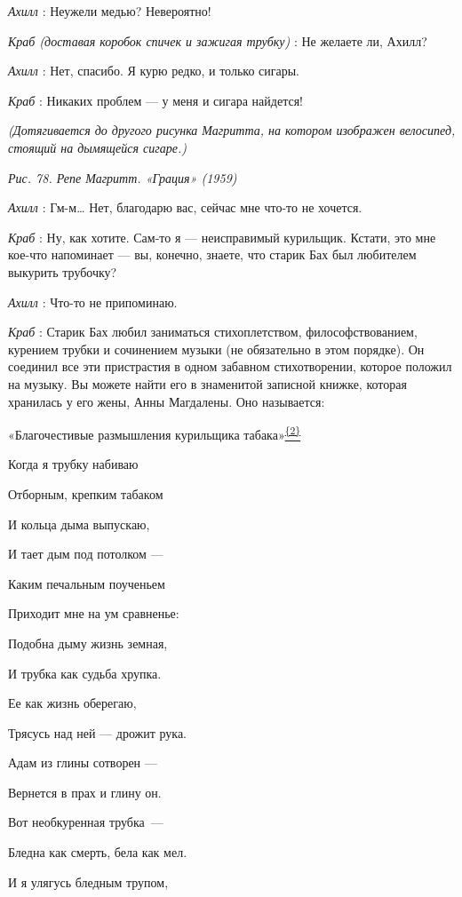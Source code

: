 \documentclass[../main.tex]{subfiles}
\begin{document}
\begin{dialogue}
\emph{Ахилл} : Неужели медью? Невероятно!

\emph{Краб (доставая коробок спичек и зажигая трубку)} : Не желаете ли, Ахилл?

\emph{Ахилл} : Нет, спасибо. Я курю редко, и только сигары.

\emph{Краб} : Никаких проблем --- у меня и сигара найдется!

\emph{(Дотягивается до другого рисунка Магритта, на котором изображен велосипед, стоящий на дымящейся сигаре.)}

\emph{Рис. 78. Репе Магритт. «Грация» (1959)}

\emph{Ахилл} : Гм-м\ldots{} Нет, благодарю вас, сейчас мне что-то не хочется.

\emph{Краб} : Ну, как хотите. Сам-то я --- неисправимый курильщик. Кстати, это мне кое-что напоминает --- вы, конечно, знаете, что старик Бах был любителем выкурить трубочку?

\emph{Ахилл} : Что-то не припоминаю.

\emph{Краб} : Старик Бах любил заниматься стихоплетством, философствованием, курением трубки и сочинением музыки (не обязательно в этом порядке). Он соединил все эти пристрастия в одном забавном стихотворении, которое положил на музыку. Вы можете найти его в знаменитой записной книжке, которая хранилась у его жены, Анны Магдалены. Оно называется:

«Благочестивые размышления курильщика табака»\protect\hyperlink{c_2}{\textsuperscript{\uline{\{2\}}}}

Когда я трубку набиваю

Отборным, крепким табаком

И кольца дыма выпускаю,

И тает дым под потолком ---

Каким печальным поученьем

Приходит мне на ум сравненье:

Подобна дыму жизнь земная,

И трубка как судьба хрупка.

Ее как жизнь оберегаю,

Трясусь над ней --- дрожит рука.

Адам из глины сотворен ---

Вернется в прах и глину он.

Вот необкуренная трубка~---

Бледна как смерть, бела как мел.

И я улягусь бледным трупом,


\end{dialogue}
\end{document}
